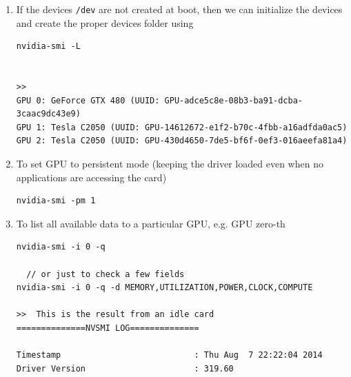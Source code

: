 \begin{enumerate}
  \item If the devices \verb!/dev! are not created at boot, then we can
  initialize the devices and create the proper devices folder using
\begin{verbatim}
nvidia-smi -L


>>
GPU 0: GeForce GTX 480 (UUID: GPU-adce5c8e-08b3-ba91-dcba-3caac9dc43e9)
GPU 1: Tesla C2050 (UUID: GPU-14612672-e1f2-b70c-4fbb-a16adfda0ac5)
GPU 2: Tesla C2050 (UUID: GPU-430d4650-7de5-bf6f-0ef3-016aeefa81a4)
\end{verbatim}

  \item To set GPU to persistent mode (keeping the driver loaded even when no
  applications are accessing the card)
\begin{verbatim}
nvidia-smi -pm 1
\end{verbatim}

  \item  To list all available data to a particular GPU, e.g. GPU zero-th
\begin{verbatim}
nvidia-smi -i 0 -q

  // or just to check a few fields
nvidia-smi -i 0 -q -d MEMORY,UTILIZATION,POWER,CLOCK,COMPUTE

>>  This is the result from an idle card
==============NVSMI LOG==============

Timestamp                           : Thu Aug  7 22:22:04 2014
Driver Version                      : 319.60


\end{verbatim}
\end{enumerate}
